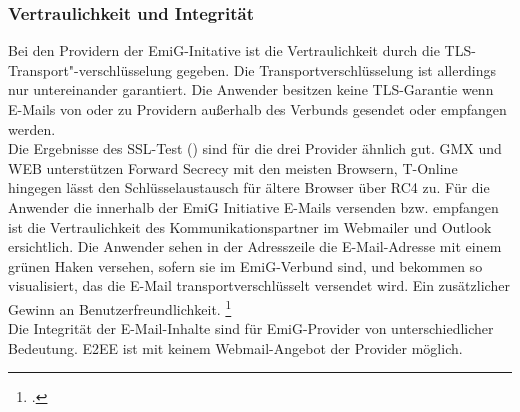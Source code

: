 \documentclass  [paper=a4,
				fontsize=12pt,
				listof=totoc,
				bibliography=totoc
				]{scrreprt}
\begin{document}
		\subsubsection{Vertraulichkeit und Integrität}		
			Bei den Providern der EmiG-Initative ist die Vertraulichkeit durch die TLS-Transport"-verschlüsselung gegeben. 
			Die Transportverschlüsselung ist allerdings nur untereinander garantiert. 
			Die Anwender besitzen keine \ac{TLS}-Garantie wenn E-Mails von oder zu Providern außerhalb des Verbunds gesendet oder empfangen werden.\\

			Die Ergebnisse des \ac{SSL}-Test () sind für die drei Provider ähnlich gut. GMX und WEB unterstützen Forward Secrecy mit den meisten Browsern, T-Online hingegen lässt den Schlüsselaustausch für ältere Browser über RC4 zu.
			Für die Anwender die innerhalb der EmiG Initiative E-Mails versenden bzw. empfangen ist die Vertraulichkeit des Kommunikationspartner im Webmailer und Outlook ersichtlich.
			Die Anwender sehen in der Adresszeile die E-Mail-Adresse mit einem grünen Haken versehen, sofern sie im \ac{EmiG}-Verbund sind, und bekommen so visualisiert, das die E-Mail transportverschlüsselt versendet wird. Ein zusätzlicher Gewinn an Benutzerfreundlichkeit.
			\footcite[Vgl.][]{Zivadino14a}\medskip\\
			Die Integrität der E-Mail-Inhalte sind für \ac{EmiG}-Provider von unterschiedlicher Bedeutung.
			\acf{E2EE} ist mit keinem Webmail-Angebot der Provider möglich.
\end{document}
